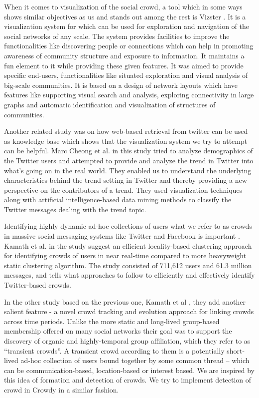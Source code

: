 \documentclass{sig-alternate}
\begin{document}
When it comes to visualization of the social crowd, a tool which in some ways
shows similar objectives as us and stands out among the rest is Vizster
\cite{Heer:2005}. It is a visualization system for which can be used for
exploration and navigation of the social networks of any scale. The system
provides facilities to improve the functionalities like discovering people or
connections which can help in promoting awareness of community structure and
exposure to information. It maintains a fun element to it while providing these
given features. It was aimed to provide specific end-users, functionalities
like situated exploration and visual analysis of big-scale communities. It is
based on a design of network layouts which have features like supporting visual
search and analysis, exploring connectivity in large graphs and automatic
identification and visualization of structures of communities.

Another related study was on how web-based retrieval from twitter can be used
as knowledge base \cite{Cheong:2009} which shows that the visualization system
we try to attempt can be helpful. Marc Cheong et al. in this study tried to
analyze demographics of the Twitter users and attempted to provide and analyze
the trend in Twitter into what's going on in the real world. They enabled us to
understand the underlying characteristics behind the trend setting in Twitter
and thereby providing a new perspective on the contributors of a trend. They
used visualization techniques along with artificial intelligence-based data
mining methods to classify the Twitter messages dealing with the trend topic.

Identifying highly dynamic ad-hoc collections of users what we refer to as
crowds in massive social messaging systems like Twitter and Facebook is
important \cite{krishna:2010}. Kamath et al. in the study suggest an
efficient locality-based clustering approach for identifying crowds of users in
near real-time compared to more heavyweight static clustering algorithm. The
study consisted of 711,612 users and 61.3 million messages, and tells what
approaches to follow to efficiently and effectively identify Twitter-based
crowds.

In the other study based on the previous one, Kamath et al
\cite{krishna:2011}, they add another salient feature - a novel crowd tracking
and evolution approach for linking crowds across time periods. Unlike the more
static and long-lived group-based membership offered on many social networks
their goal was to support the discovery of organic and highly-temporal group
affiliation, which they refer to as ``transient crowds''. A transient crowd
according to them is a potentially short-lived ad-hoc collection of users bound
together by some common thread – which can be communication-based,
location-based or interest based. We are inspired by this idea of formation and
detection of crowds. We try to implement detection of crowd in Crowdy in a
similar fashion.
\end{document}
